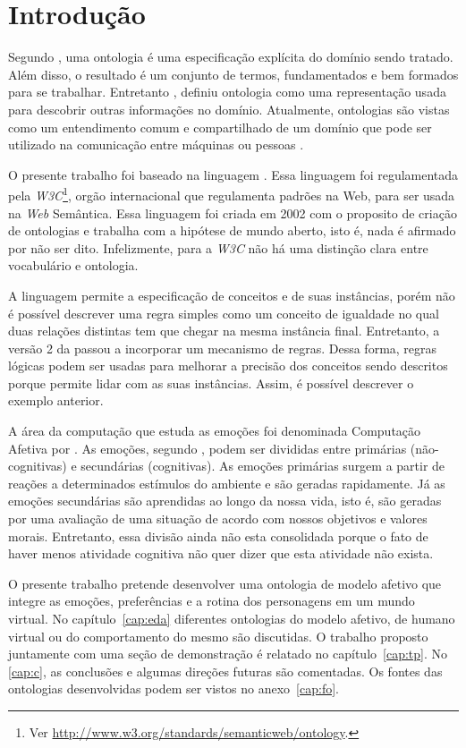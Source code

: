 \chapter{Introdução}

Segundo \citet{gruber1993translation}, uma ontologia é uma especificação
explícita do domínio sendo tratado. Além disso, o resultado é um conjunto de
termos, fundamentados e bem formados para se trabalhar. Entretanto
\citet{ontoly2004Approach}, definiu ontologia como uma representação usada
para descobrir outras informações no domínio. Atualmente, ontologias são
vistas como um entendimento comum e compartilhado de um domínio que pode ser
utilizado na comunicação entre máquinas ou pessoas \cite{wks2008towards}.

O presente trabalho foi baseado na linguagem \OWL. Essa linguagem foi
regulamentada pela \emph{W3C}\footnote{Ver
\url{http://www.w3.org/standards/semanticweb/ontology}.}, orgão internacional
que regulamenta padrões na Web, para ser usada na \emph{Web} Semântica. Essa
linguagem foi criada em 2002 com o proposito de criação de ontologias e
trabalha com a hipótese de mundo aberto, isto é, nada é afirmado por não ser
dito. Infelizmente, para a \emph{W3C} não há uma distinção clara entre vocabulário e
ontologia.

A linguagem \OWL permite a especificação de conceitos e de suas instâncias,
porém não é possível descrever uma regra simples como um conceito de igualdade
no qual duas relações distintas tem que chegar na mesma instância final.
%
Entretanto, a versão 2 da \OWL passou a incorporar um mecanismo de regras.
Dessa forma, regras lógicas podem ser usadas para melhorar a precisão dos
conceitos sendo descritos porque permite lidar com as suas instâncias. Assim,
é possível descrever o exemplo anterior.

A área da computação que estuda as emoções foi denominada Computação Afetiva por
\citet{Pic98}. As emoções, segundo \citet{damasio2004erro}, podem ser divididas
entre primárias (não-cognitivas) e secundárias (cognitivas). As emoções
primárias surgem a partir de reações a determinados estímulos do ambiente e são
geradas rapidamente. Já as emoções secundárias são aprendidas ao longo da
nossa vida, isto é, são geradas por uma avaliação de uma situação de acordo
com nossos objetivos e valores morais. Entretanto, essa divisão ainda não esta
consolidada porque o fato de haver menos atividade cognitiva não quer dizer
que esta atividade não exista.

O presente trabalho pretende desenvolver uma ontologia de modelo afetivo que
integre as emoções, preferências e a rotina dos personagens em um mundo
virtual. No capítulo~\ref{cap:eda} diferentes ontologias do modelo afetivo, de
humano virtual ou do comportamento do mesmo são discutidas. O trabalho
proposto juntamente com uma seção de demonstração é relatado no
capítulo~\ref{cap:tp}. No \ref{cap:c}, as conclusões e algumas direções
futuras são comentadas.  Os fontes das ontologias desenvolvidas podem ser
vistos no anexo~\ref{cap:fo}.

